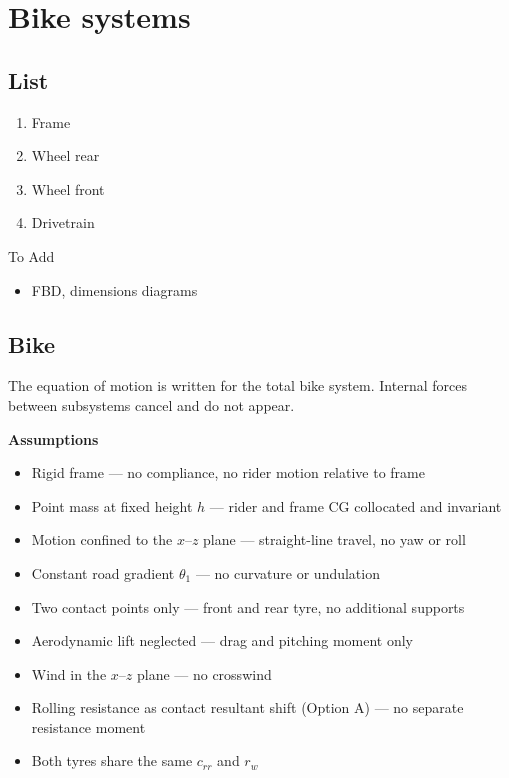 \documentclass[10pt]{extarticle}
\numberwithin{equation}{subsubsection}
\begin{document}
\section{Bike systems}

\subsection{List}
\begin{enumerate}
    \item Frame
    \item Wheel rear
    \item Wheel front
    \item Drivetrain
\end{enumerate}
To Add
\begin{itemize}
    \item FBD, dimensions diagrams
\end{itemize}

\newpage
\subsection{Bike}

The equation of motion is written for the total bike system. Internal forces between subsystems cancel and do not appear.

\textbf{Assumptions}
\begin{itemize}
    \item Rigid frame --- no compliance, no rider motion relative to frame
    \item Point mass at fixed height $h$ --- rider and frame CG collocated and invariant
    \item Motion confined to the $x$--$z$ plane --- straight-line travel, no yaw or roll
    \item Constant road gradient $\theta_1$ --- no curvature or undulation
    \item Two contact points only --- front and rear tyre, no additional supports
    \item Aerodynamic lift neglected --- drag and pitching moment only
    \item Wind in the $x$--$z$ plane --- no crosswind
    \item Rolling resistance as contact resultant shift (Option A) --- no separate resistance moment
    \item Both tyres share the same $c_{rr}$ and $r_w$
\end{itemize}
\end{document}
